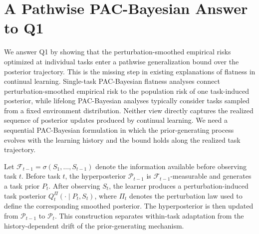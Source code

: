 \documentclass{article}
\begin{document}


\section{A Pathwise PAC-Bayesian Answer to Q1}
\label{sec:pathwise_pac_bayes_q1}

We answer Q1 by showing that the perturbation-smoothed empirical risks optimized at individual tasks enter a pathwise generalization bound over the posterior trajectory.
This is the missing step in existing explanations of flatness in continual learning.
Single-task PAC-Bayesian flatness analyses connect perturbation-smoothed empirical risk to the population risk of one task-induced posterior, while lifelong PAC-Bayesian analyses typically consider tasks sampled from a fixed environment distribution.
Neither view directly captures the realized sequence of posterior updates produced by continual learning.
We need a sequential PAC-Bayesian formulation in which the prior-generating process evolves with the learning history and the bound holds along the realized task trajectory.

Let $\mathcal F_{t-1}=\sigma(S_1,\ldots,S_{t-1})$ denote the information available before observing task $t$.
Before task $t$, the hyperposterior $\mathcal P_{t-1}$ is $\mathcal F_{t-1}$-measurable and generates a task prior $P_t$.
After observing $S_t$, the learner produces a perturbation-induced task posterior $Q_t^\Pi(\cdot\mid P_t,S_t)$, where $\Pi_t$ denotes the perturbation law used to define the corresponding smoothed posterior.
The hyperposterior is then updated from $\mathcal P_{t-1}$ to $\mathcal P_t$.
This construction separates within-task adaptation from the history-dependent drift of the prior-generating mechanism.
\end{document}
